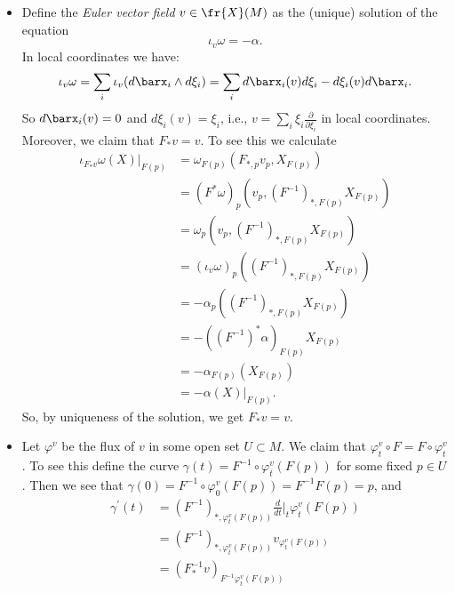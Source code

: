 \begin{itemize}
    \item Define the \textit{Euler vector field} $v\in\fr{X}(M)$ as the (unique) solution of the equation
    \begin{equation}
        \iota_v\omega = -\alpha.
    \end{equation}
    In local coordinates we have:
    \begin{equation}
        \iota_v\omega = \sum_i\iota_v(d\barx_i\wedge d\xi_i)=\sum_i d\barx_i(v)d\xi_i-d\xi_i(v)d\barx_i.
    \end{equation}
    So $d\barx_i(v)=0$ and $d\xi_i(v)=\xi_i$, i.e., $v = \sum_i\xi_i\frac{\partial}{\partial\xi_i}$ in local coordinates. 
    Moreover, we claim that $F_*v = v$. To see this we calculate
    \begin{equation}
        \begin{split}
            \iota_{F_*v}\omega(X)\big|_{F(p)}&=\omega_{F(p)}(F_{*,p}v_p,X_{F(p)})\\
            &= (F^*\omega)_p(v_p, (F^{-1})_{*,F(p)}X_{F(p)})\\
            &=\omega_p(v_p, (F^{-1})_{*,F(p)}X_{F(p)})\\
            &=(\iota_v\omega)_p((F^{-1})_{*,F(p)}X_{F(p)})\\
            &=-\alpha_p((F^{-1})_{*,F(p)}X_{F(p)})\\
            &=-((F^{-1})^*\alpha)_{F(p)}X_{F(p)}\\
            &=-\alpha_{F(p)}(X_{F(p)})\\
            &=-\alpha(X)\big|_{F(p)}.
        \end{split}
    \end{equation}
    So, by uniqueness of the solution, we get $F_*v=v$.
    \item Let $\varphi^v$ be the flux of $v$ in some open set $U\subset M$. We claim that $\varphi_t^v\circ F = F\circ\varphi_t^v$. 
    To see this define the curve $\gamma(t)= F^{-1}\circ\varphi_t^v(F(p))$ for some fixed $p\in U$. Then we see that 
    $\gamma(0)= F^{-1}\circ\varphi_0^v(F(p)) = F^{-1}F(p) =p$, and 
    \begin{equation}
       \begin{split}
        \gamma^\prime(t)&= (F^{-1})_{*,\varphi_t^v(F(p))} \frac{d}{dt}\bigg|_t\varphi_t^v(F(p))\\
        &=(F^{-1})_{*,\varphi_t^v(F(p))}v_{\varphi_t^v(F(p))}\\
        &=(F^{-1}_*v)_{F^{-1}\varphi_t^v(F(p))}\\

\end{split}
\end{equation}
\end{itemize}
